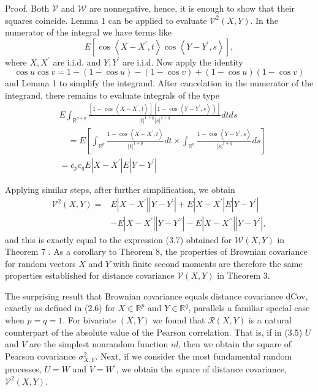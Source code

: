 	Proof. Both $\mathcal{V}$ and $\mathcal{W}$ are nonnegative, hence, it is enough to show that their squares coincide. Lemma 1 can be applied to evaluate $\mathcal{V}^2(X, Y)$. In the numerator of the integral we have terms like
	$$
	E\left[\cos \left\langle X-X^{\prime}, t\right\rangle \cos \left\langle Y-Y^{\prime}, s\right\rangle\right],
	$$
	where $X, X^{\prime}$ are i.i.d. and $Y, Y^{\prime}$ are i.i.d. Now apply the identity
	$$
	\cos u \cos v=1-(1-\cos u)-(1-\cos v)+(1-\cos u)(1-\cos v)
	$$
	and Lemma 1 to simplify the integrand. After cancelation in the numerator of the integrand, there remains to evaluate integrals of the type
	$$
	\begin{aligned}
	& E \int_{\mathbb{R}^{p+q}} \frac{\left.\left[1-\cos \left\langle X-X^{\prime}, t\right\rangle\right]\left[1-\cos \left\langle Y-Y^{\prime}, s\right\rangle\right)\right]}{|t|^{1+p}|s|^{1+q}} d t d s \\
	& \quad=E\left[\int_{\mathbb{R}^p} \frac{1-\cos \left\langle X-X^{\prime}, t\right\rangle}{|t|^{1+p}} d t \times \int_{\mathbb{R}^q} \frac{1-\cos \left\langle Y-Y^{\prime}, s\right\rangle}{|s|^{1+q}} d s\right] \\
	& =c_p c_q E\left|X-X^{\prime}\right| E\left|Y-Y^{\prime}\right|
	\end{aligned}
	$$
	
	Applying similar steps, after further simplification, we obtain
	$$
	\begin{aligned}
	\mathcal{V}^2(X, Y)= & E\left|X-X^{\prime}\right|\left|Y-Y^{\prime}\right|+E\left|X-X^{\prime}\right| E\left|Y-Y^{\prime}\right| \\
	& -E\left|X-X^{\prime}\right|\left|Y-Y^{\prime \prime}\right|-E\left|X-X^{\prime \prime}\right|\left|Y-Y^{\prime}\right|,
	\end{aligned}
	$$
	and this is exactly equal to the expression (3.7) obtained for $\mathcal{W}(X, Y)$ in Theorem 7 .
	As a corollary to Theorem 8, the properties of Brownian covariance for random vectors $X$ and $Y$ with finite second moments are therefore the same properties established for distance covariance $\mathcal{V}(X, Y)$ in Theorem 3.

	The surprising result that Brownian covariance equals distance covariance dCov, exactly as defined in (2.6) for $X \in \mathbb{R}^p$ and $Y \in \mathbb{R}^q$, parallels a familiar special case when $p=q=1$. For bivariate $(X, Y)$ we found that $\mathcal{R}(X, Y)$ is a natural counterpart of the absolute value of the Pearson correlation. That is, if in (3.5) $U$ and $V$ are the simplest nonrandom function $i d$, then we obtain the square of Pearson covariance $\sigma_{X, Y}^2$. Next, if we consider the most fundamental random processes, $U=W$ and $V=W^{\prime}$, we obtain the square of distance covariance, $\mathcal{V}^2(X, Y)$.

